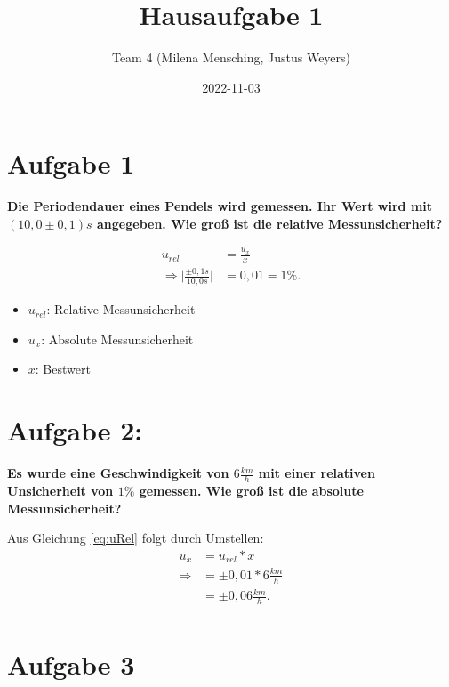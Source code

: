 \documentclass[
]{article}
\title{Hausaufgabe 1}
\author{Team 4 (Milena Mensching, Justus Weyers)}
\date{2022-11-03}
\begin{document}
\maketitle

\hypertarget{aufgabe-1}{%
\section{Aufgabe 1}\label{aufgabe-1}}

\textbf{Die Periodendauer eines Pendels wird gemessen. Ihr Wert wird mit
\((10,0 \pm 0,1)s\) angegeben. Wie groß ist die relative
Messunsicherheit?}

\begin{equation}\label{eq:uRel}
  \begin{split}
    u_{rel} &= \frac{u_x}{x} \\
    \Rightarrow \vert\frac{\pm0,1s}{10,0s}\vert & = 0,01 = 1\%.
  \end{split}
\end{equation}

\begin{itemize}
  \item  $u_{rel}$: Relative Messunsicherheit
  \item  $u_x$: Absolute Messunsicherheit
  \item  $x$: Bestwert
\end{itemize}

\hypertarget{aufgabe-2}{%
\section{Aufgabe 2:}\label{aufgabe-2}}

\textbf{Es wurde eine Geschwindigkeit von \(6 \frac{km}{h}\) mit einer
relativen Unsicherheit von \(1 \%\) gemessen. Wie groß ist die absolute
Messunsicherheit?}

Aus Gleichung \ref{eq:uRel} folgt durch Umstellen:
\begin{equation}\label{eq:uAbs}
  \begin{split}
            u_x &= u_{rel}*x \\
    \Rightarrow & = \pm 0,01 * 6 \frac{km}{h}\\
                &= \pm 0,06 \frac{km}{h}.\\
  \end{split}
\end{equation}

\hypertarget{aufgabe-3}{%
\section{Aufgabe 3}\label{aufgabe-3}}
\end{document}
